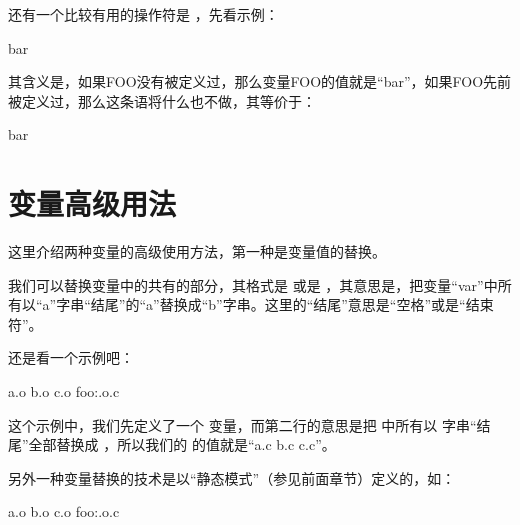 \documentclass[a4paper,10pt]{sphinxmanual}
\begin{document}
还有一个比较有用的操作符是  ，先看示例：

\begin{sphinxVerbatim}[commandchars=\\\{\}]
  bar
\end{sphinxVerbatim}

其含义是，如果FOO没有被定义过，那么变量FOO的值就是“bar”，如果FOO先前被定义过，那么这条语将什么也不做，其等价于：

\begin{sphinxVerbatim}[commandchars=\\\{\}]
      bar
\end{sphinxVerbatim}


\section{变量高级用法}
\label{\detokenize{variables:id4}}
这里介绍两种变量的高级使用方法，第一种是变量值的替换。

我们可以替换变量中的共有的部分，其格式是  或是  ，其意思是，把变量“var”中所有以“a”字串“结尾”的“a”替换成“b”字串。这里的“结尾”意思是“空格”或是“结束符”。

还是看一个示例吧：

\begin{sphinxVerbatim}[commandchars=\\\{\}]
  a.o b.o c.o
  foo:.o.c
\end{sphinxVerbatim}

这个示例中，我们先定义了一个  变量，而第二行的意思是把  中所有以
 字串“结尾”全部替换成  ，所以我们的  的值就是“a.c b.c c.c”。

另外一种变量替换的技术是以“静态模式”（参见前面章节）定义的，如：

\begin{sphinxVerbatim}[commandchars=\\\{\}]
  a.o b.o c.o
  foo:\PYGZpc{}.o\PYGZpc{}.c
\end{sphinxVerbatim}
\end{document}
